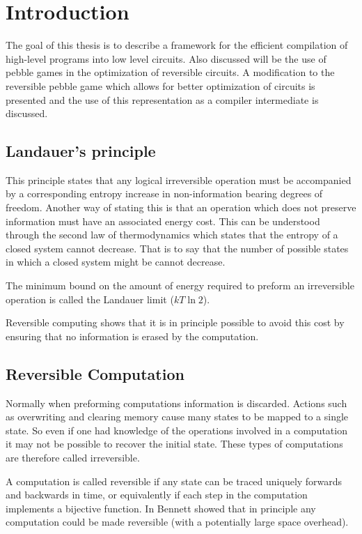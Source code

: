 \chapter{Introduction}

The goal of this thesis is to describe a framework for the efficient
compilation of high-level programs into low level circuits. Also discussed will
be the use of pebble games in the optimization of reversible circuits.  A
modification to the reversible pebble game which allows for better optimization
of circuits is presented and the use of this representation as a compiler
intermediate is discussed.

\section{Landauer's principle}

This principle\cite{landauer61} states that any logical irreversible operation
must be accompanied by a corresponding entropy increase in non-information
bearing degrees of freedom. Another way of stating this is that an operation
which does not preserve information must have an associated energy cost. This
can be understood through the second law of thermodynamics which states that
the entropy of a closed system cannot decrease. That is to say that the number
of possible states in which a closed system might be cannot decrease.

The minimum bound on the amount of energy required to preform an irreversible
operation is called the Landauer limit ($kT\ln 2$).

Reversible computing shows that it is in principle possible to avoid this cost
by ensuring that no information is erased by the computation.

\section{Reversible Computation}

Normally when preforming computations information is discarded. Actions such as
overwriting and clearing memory cause many states to be mapped to a single
state. So even if one had knowledge of the operations involved in a computation it
may not be possible to recover the initial state. These types of computations
are therefore called irreversible.

A computation is called reversible if any state can be traced uniquely forwards
and backwards in time, or equivalently if each step in the computation
implements a bijective function. In \cite{Bennett:73} Bennett showed that in
principle any computation could be made reversible (with a potentially large
space overhead).

